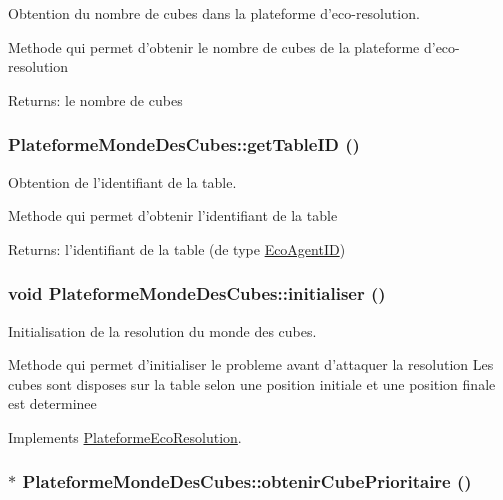 Obtention du nombre de cubes dans la plateforme d'eco-resolution. 

Methode qui permet d'obtenir le nombre de cubes de la plateforme d'eco-resolution

\begin{Desc}
\item[Returns:]le nombre de cubes \end{Desc}
\hypertarget{classPlateformeMondeDesCubes_8919ce255ec5689a9dfce09667f0b461}{
\subsubsection[{getTableID}]{ PlateformeMondeDesCubes::getTableID ()}}
\label{classPlateformeMondeDesCubes_8919ce255ec5689a9dfce09667f0b461}


Obtention de l'identifiant de la table. 

Methode qui permet d'obtenir l'identifiant de la table

\begin{Desc}
\item[Returns:]l'identifiant de la table (de type \hyperlink{classEcoAgentID}{EcoAgentID}) \end{Desc}
\hypertarget{classPlateformeMondeDesCubes_67160be6f5ecd0b8f3fffeb1a7bd81ba}{
\subsubsection[{initialiser}]{\setlength{\rightskip}{0pt plus 5cm}void PlateformeMondeDesCubes::initialiser ()}}
\label{classPlateformeMondeDesCubes_67160be6f5ecd0b8f3fffeb1a7bd81ba}


Initialisation de la resolution du monde des cubes. 

Methode qui permet d'initialiser le probleme avant d'attaquer la resolution Les cubes sont disposes sur la table selon une position initiale et une position finale est determinee 

Implements \hyperlink{classPlateformeEcoResolution_57d87139f09ca51cd6a4fa7cd2e83351}{PlateformeEcoResolution}.\hypertarget{classPlateformeMondeDesCubes_605987b8e7760eacc2db63d56a58daa1}{
\subsubsection[{obtenirCubePrioritaire}]{$\ast$ PlateformeMondeDesCubes::obtenirCubePrioritaire ()}}
\label{classPlateformeMondeDesCubes_605987b8e7760eacc2db63d56a58daa1}


